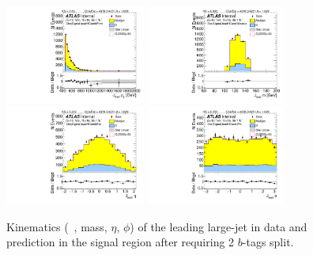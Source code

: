 \begin{figure}[htb!]
\begin{center}
\includegraphics[width=0.41\textwidth,angle=-90]{figures/boosted/Signal/b77_TwoTag_split_Signal_leadHCand_Pt_m.pdf}
\includegraphics[width=0.41\textwidth,angle=-90]{figures/boosted/Signal/b77_TwoTag_split_Signal_leadHCand_Mass_s.pdf}\\
\includegraphics[width=0.41\textwidth,angle=-90]{figures/boosted/Signal/b77_TwoTag_split_Signal_leadHCand_Eta.pdf}
\includegraphics[width=0.41\textwidth,angle=-90]{figures/boosted/Signal/b77_TwoTag_split_Signal_leadHCand_Phi.pdf}
  \caption{Kinematics (\pt~, mass, $\eta$, $\phi$) of the leading large-\R jet in data and prediction in the signal region after requiring 2 $b$-tags split. }
  \label{fig:boosted-2bs-signal-ak10-lead}
\end{center}
\end{figure}

